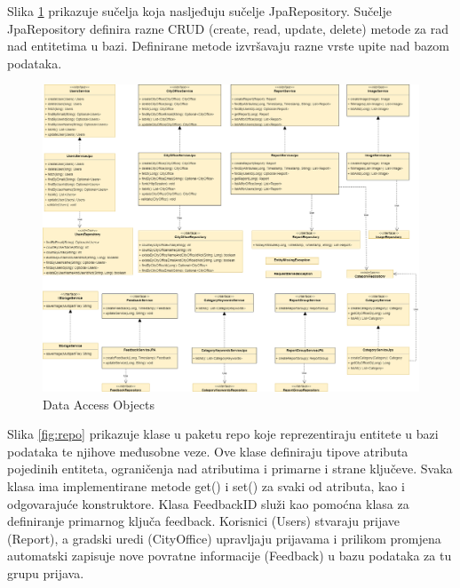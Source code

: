 			\eject
			
			Slika \ref{fig:dao} prikazuje sučelja koja nasljeđuju sučelje JpaRepository. Sučelje JpaRepository definira razne CRUD (create, read, update, delete) metode za rad nad entitetima u bazi. Definirane metode izvršavaju razne vrste upite nad bazom podataka.
			
			\begin{figure}[H]
				\includegraphics[width=\textwidth]{slike/dao.png} %
				\caption{Data Access Objects}
				\label{fig:dao} %
			\end{figure}
			
			\eject
			
			Slika \ref{fig:repo} prikazuje klase u paketu repo koje reprezentiraju entitete u bazi podataka te njihove međusobne veze. Ove klase definiraju tipove atributa pojedinih entiteta, ograničenja nad atributima i primarne i strane ključeve. Svaka klasa ima implementirane metode get() i set() za svaki od atributa, kao i odgovarajuće konstruktore. Klasa FeedbackID služi kao pomoćna klasa za definiranje primarnog ključa feedback. Korisnici (Users) stvaraju prijave (Report), a gradski uredi (CityOffice) upravljaju prijavama i prilikom promjena automatski zapisuje nove povratne informacije (Feedback) u bazu podataka za tu grupu prijava.
			
